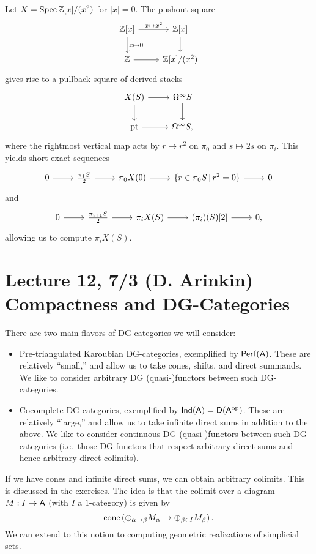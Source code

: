 \documentclass{amsart}
\begin{document}
\begin{ex}
	Let $X = \operatorname{Spec} \mathbb{Z}[x] / (x^2)$ for $|x| = 0$.
	The pushout square
	\[
		\begin{tikzcd}
			{\ZZ[x]} \rar["x \mapsto x^2"] \dar["x \mapsto 0"] & \ZZ[x] \dar \\
			\ZZ \rar & \ZZ[x] / (x^2)
		\end{tikzcd}
	\]
	gives rise to a pullback square of derived stacks
	\[
		\begin{tikzcd}
			X(S) \rar \dar & \Omega^\infty S \dar \\
			\pt \rar & \Omega^\infty S,
		\end{tikzcd}
	\]
	where the rightmost vertical map acts by $r \mapsto r^2$ on $\pi_0$ and $s \mapsto 2s$ on $\pi_i$.
	This yields short exact sequences
	\[
		\begin{tikzcd}
			0 \rar & \frac{\pi_1 S}{2} \rar & \pi_0 X(0) \rar & \{ r \in \pi_0 S \, | \, r^2 = 0 \} \rar & 0
		\end{tikzcd}
	\]
	and
	\[
		\begin{tikzcd}
			0 \rar & \frac{\pi_{i+1} S}{2} \rar & \pi_i X(S) \rar & (\pi_i)(S)[2] \rar & 0,
		\end{tikzcd}
	\]
	allowing us to compute $\pi_i X(S)$.
\end{ex}

\section{Lecture 12, 7/3 (D. Arinkin) -- Compactness and DG-Categories}

There are two main flavors of DG-categories we will consider:
\begin{itemize}
	\item Pre-triangulated Karoubian DG-categories, exemplified by $\mathsf{Perf}(\mathsf{A})$.
		These are relatively ``small,'' and allow us to take cones, shifts, and direct summands.
		We like to consider arbitrary DG (quasi-)functors between such DG-categories.
	\item Cocomplete DG-categories, exemplified by $\mathsf{Ind}(\mathsf{A}) = \mathsf{D}(\mathsf{A}^{\mathrm{op}})$.
		These are relatively ``large,'' and allow us to take infinite direct sums in addition to the above.
		We like to consider continuous DG (quasi-)functors between such DG-categories (i.e.\ those DG-functors that respect arbitrary direct sums and hence arbitrary direct colimits).
\end{itemize}

\begin{rmk}
	If we have cones and infinite direct sums, we can obtain arbitrary colimits.
	This is discussed in the exercises.
	The idea is that the colimit over a diagram $M: I \to \mathsf{A}$ (with $I$ a $1$-category) is given by
	\[
		\operatorname{cone}\left( \oplus_{\alpha \to \beta} M_\alpha \to \oplus_{\beta \in I} M_\beta \right).
	\]
	We can extend to this notion to computing geometric realizations of simplicial sets.
\end{rmk}
\end{document}
